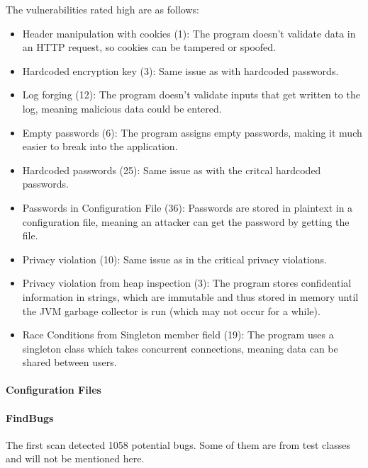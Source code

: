 \documentclass{article}
\begin{document}
\begin{itemize}
  The vulnerabilities rated high are as follows:

  \begin{itemize}
  \item Header manipulation with cookies (1): The program doesn't validate data
    in an HTTP request, so cookies can be tampered or spoofed.
  \item Hardcoded encryption key (3): Same issue as with hardcoded passwords.
  \item Log forging (12): The program doesn't validate inputs that get written
    to the log, meaning malicious data could be entered.
  \item Empty passwords (6): The program assigns empty passwords, making it much
    easier to break into the application.
  \item Hardcoded passwords (25): Same issue as with the critcal hardcoded passwords.
  \item Passwords in Configuration File (36): Passwords are stored in plaintext
    in a configuration file, meaning an attacker can get the password by getting
    the file.
  \item Privacy violation (10): Same issue as in the critical privacy violations.
  \item Privacy violation from heap inspection (3): The program stores
    confidential information in strings, which are immutable and thus stored in
    memory until the JVM garbage collector is run (which may not occur for a
    while). 
  \item Race Conditions from Singleton member field (19): The program uses a
    singleton class which takes concurrent connections, meaning data can be
    shared between users.
  \end{itemize}
      
\paragraph{Configuration Files}  

\paragraph{FindBugs}

  The first scan detected 1058 potential bugs. Some of them are from test classes
  and will not be mentioned here.
  

\end{itemize}
\end{document}
